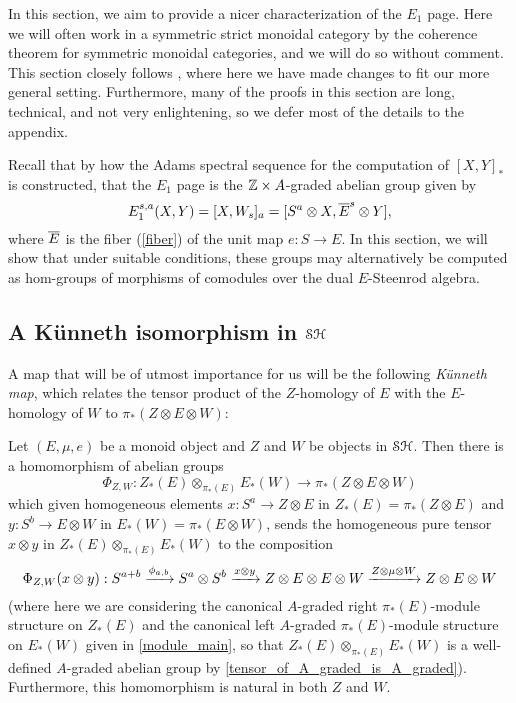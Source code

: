 \documentclass[../main.tex]{subfiles}
\begin{document}
In this section, we aim to provide a nicer characterization of the $E_1$ page. Here we will often work in a symmetric strict monoidal category by the coherence theorem for symmetric monoidal categories, and we will do so without comment. This section closely follows \cite[Section 2]{nlab:introduction_to_the_adams_spectral_sequence}, where here we have made changes to fit our more general setting. Furthermore, many of the proofs in this section are long, technical, and not very enlightening, so we defer most of the details to the appendix.

Recall that by how the Adams spectral sequence for the computation of $[X,Y]_*$ is constructed, that the $E_1$ page is the $\mathbb{Z}\times A$-graded abelian group given by
\[E_1^{s,a}(X,Y)=[X,W_s]_a=[S^a\otimes X,{\overline E}^s\otimes Y],\]
where $\overline E$ is the fiber (\autoref{fiber}) of the unit map $e:S\to E$. In this section, we will show that under suitable conditions, these groups may alternatively be computed as hom-groups of morphisms of comodules over the dual $E$-Steenrod algebra.

\subsection{A K\"unneth isomorphism in \texorpdfstring{$\mathcal{SH}$}{SH}}

A map that will be of utmost importance for us will be the following \emph{K\"unneth map}, which relates the tensor product of the $Z$-homology of $E$ with the $E$-homology of $W$ to $\pi_*(Z\otimes E\otimes W)$:

\begin{proposition}\label{Kunneth_map_construction_main}
    Let $(E,\mu,e)$ be a monoid object and $Z$ and $W$ be objects in $\mathcal{SH}$. Then there is a homomorphism of abelian groups
    \[\Phi_{Z,W}:Z_*(E)\otimes_{\pi_*(E)}E_*(W)\to\pi_*(Z\otimes E\otimes W)\]
    which given homogeneous elements $x:S^a\to Z\otimes E$ in $Z_*(E)=\pi_*(Z\otimes E)$  and $y:S^b\to E\otimes W$ in $E_*(W)=\pi_*(E\otimes W)$, sends the homogeneous pure tensor $x\otimes y$ in $Z_*(E)\otimes_{\pi_*(E)}E_*(W)$ to the composition
    \[\Phi_{Z,W}(x\otimes y):S^{a+b}\xrightarrow{\phi_{a,b}}S^a\otimes S^b\xrightarrow{x\otimes y}Z\otimes E\otimes E\otimes W\xrightarrow{Z\otimes\mu\otimes W}Z\otimes E\otimes W\]
    (where here we are considering the canonical $A$-graded right $\pi_*(E)$-module structure on $Z_*(E)$ and the canonical left $A$-graded $\pi_*(E)$-module structure on $E_*(W)$ given in \autoref{module_main}, so that $Z_*(E)\otimes_{\pi_*(E)}E_*(W)$ is a well-defined $A$-graded abelian group by \autoref{tensor_of_A_graded_is_A_graded}). Furthermore, this homomorphism is natural in both $Z$ and $W$.
\end{proposition}
\end{document}
